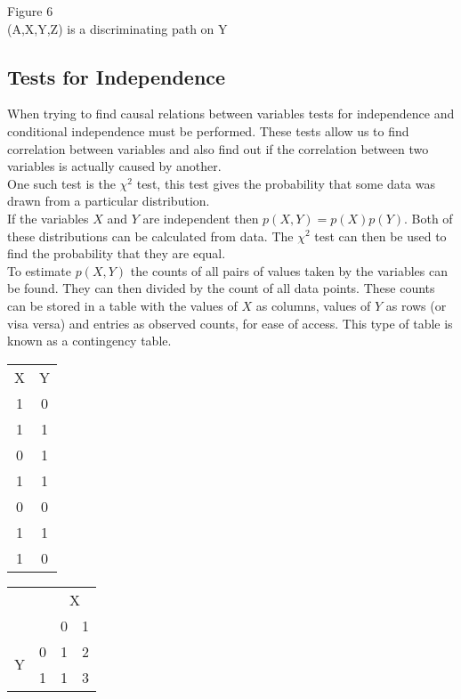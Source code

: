 \documentclass{article}
\begin{document}
\begin{center}
	Figure 6 \\
	(A,X,Y,Z) is a discriminating path on Y
\end{center}

\subsection{Tests for Independence}
When trying to find causal relations between variables tests for independence and conditional independence must be performed. These tests allow us to find correlation between variables and also find out if the correlation between two variables is actually caused by another.\\

One such test is the $\chi^2$ test, this test gives the probability that some data was drawn from a particular distribution.\\

If the variables $X$ and $Y$ are independent then $p(X,Y) = p(X)p(Y)$. Both of these distributions can be calculated from data. The $\chi^2$ test can then be used to find the probability that they are equal.\\

To estimate $p(X,Y)$ the counts of all pairs of values taken by the variables can be found. They can then divided by the count of all data points. These counts can be stored in a table with the values of $X$ as columns, values of $Y$ as rows (or visa versa) and entries as observed counts, for ease of access. This type of table is known as a contingency table.\\

\begin{table}[h!]
	\centering
	\begin{tabular}{c|c}
		X & Y \\ \cline{1-2}
		1 & 0 \\
		1 & 1 \\ 
		0 & 1 \\ 
		1 & 1 \\ 
		0 & 0 \\ 
		1 & 1 \\ 
		1 & 0 \\ 
	\end{tabular}
	\begin{tabular}{c|c|cc|}
		\multicolumn{2}{c}{}& \multicolumn{2}{c}{X} \\ \cline{3-4}
		\multicolumn{2}{c|}{} & 0 & 1 \\ \cline{2-4}
		\multirow{2}{*}{Y} & 0 & 1 & 2\\
		& 1 & 1 & 3 \\
		\cline{2-4} 
	\end{tabular}
\end{table}
\end{document}
